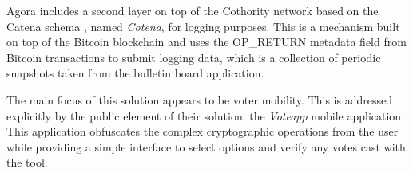 \documentclass[../access.tex]{subfiles}
\begin{document}
		\par
        Agora includes a second layer on top of the Cothority network based on the Catena schema \cite{Tomescu2017}, named \textit{Cotena}, for logging purposes. This is a mechanism built on top of the Bitcoin blockchain and uses the OP\_RETURN metadata field from Bitcoin transactions to submit logging data, which is a collection of periodic snapshots taken from the bulletin board application.
		\par
        The main focus of this solution appears to be voter mobility. This is addressed explicitly by the public element of their solution: the \textit{Voteapp} mobile application. This application obfuscates the complex cryptographic operations from the user while providing a simple interface to select options and verify any votes cast with the tool.
	
\end{document}
